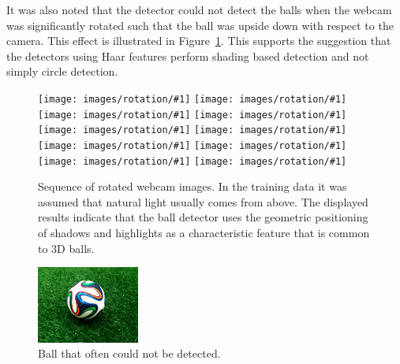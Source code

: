 \documentclass{sig-alternate-05-2015}
\begin{document}
{{		It was also noted that the detector could not detect the balls when the webcam was significantly rotated such that the ball was upside down with respect to the camera. This effect is illustrated in Figure~\ref{fig:rotated_sequence}. This supports the suggestion that the detectors using Haar features perform shading based detection and not simply circle detection.





		\newcommand{\includesequence}[1]{\hspace{0.05cm}\texttt{[image: images/rotation/\#1]}}

		\begin{figure}[H]
  			\centering
  			\includesequence{2}
  			\includesequence{25}
  			\includesequence{31}
  			\includesequence{35}
  			\includesequence{39}
  			\includesequence{43}
  			\includesequence{53}
  			\includesequence{59}
  			\includesequence{64}
  			\includesequence{74}
  			\caption{Sequence of rotated webcam images. In the training data it was assumed that natural light usually comes from above. The displayed results indicate that the ball detector uses the geometric positioning of shadows and highlights as a characteristic feature that is common to 3D balls.}
  			\label{fig:rotated_sequence}
		\end{figure}

	}



    \begin{figure}
			\centering
			\includegraphics[width=0.3\textwidth]{images/fifa_ball}
			\caption{Ball that often could not be detected.}
			\label{fig:fifa_ball}
		\end{figure}


}
\end{document}
